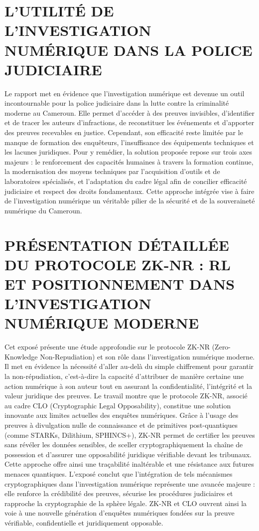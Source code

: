 \documentclass[memoire, 12pt]{report}
\begin{document}
\newpage
\section{L’UTILITÉ DE L’INVESTIGATION
NUMÉRIQUE DANS LA POLICE JUDICIAIRE}

Le rapport met en évidence que l’investigation numérique est devenue un outil incontournable pour la police judiciaire dans la lutte contre la criminalité moderne au Cameroun. Elle permet d’accéder à des preuves invisibles, d’identifier et de tracer les auteurs d’infractions, de reconstituer les événements et d’apporter des preuves recevables en justice. Cependant, son efficacité reste limitée par le manque de formation des enquêteurs, l’insuffisance des équipements techniques et les lacunes juridiques. Pour y remédier, la solution proposée repose sur trois axes majeurs : le renforcement des capacités humaines à travers la formation continue, la modernisation des moyens techniques par l’acquisition d’outils et de laboratoires spécialisés, et l’adaptation du cadre légal afin de concilier efficacité judiciaire et respect des droits fondamentaux. Cette approche intégrée vise à faire de l’investigation numérique un véritable pilier de la sécurité et de la souveraineté numérique du Cameroun.


\section{PRÉSENTATION DÉTAILLÉE DU PROTOCOLE ZK-NR : RL ET
POSITIONNEMENT DANS L’INVESTIGATION NUMÉRIQUE
MODERNE}

Cet exposé présente une étude approfondie sur le protocole ZK-NR (Zero-Knowledge Non-Repudiation) et son rôle dans l’investigation numérique moderne. Il met en évidence la nécessité d’aller au-delà du simple chiffrement pour garantir la non-répudiation, c’est-à-dire la capacité d’attribuer de manière certaine une action numérique à son auteur tout en assurant la confidentialité, l’intégrité et la valeur juridique des preuves. Le travail montre que le protocole ZK-NR, associé au cadre CLO (Cryptographic Legal Opposability), constitue une solution innovante aux limites actuelles des enquêtes numériques.
Grâce à l’usage des preuves à divulgation nulle de connaissance et de primitives post-quantiques (comme STARKs, Dilithium, SPHINCS+), ZK-NR permet de certifier les preuves sans révéler les données sensibles, de sceller cryptographiquement la chaîne de possession et d’assurer une opposabilité juridique vérifiable devant les tribunaux. Cette approche offre ainsi une traçabilité inaltérable et une résistance aux futures menaces quantiques.
L’exposé conclut que l’intégration de tels mécanismes cryptographiques dans l’investigation numérique représente une avancée majeure : elle renforce la crédibilité des preuves, sécurise les procédures judiciaires et rapproche la cryptographie de la sphère légale. ZK-NR et CLO ouvrent ainsi la voie à une nouvelle génération d’enquêtes numériques fondées sur la preuve vérifiable, confidentielle et juridiquement opposable.
\end{document}
